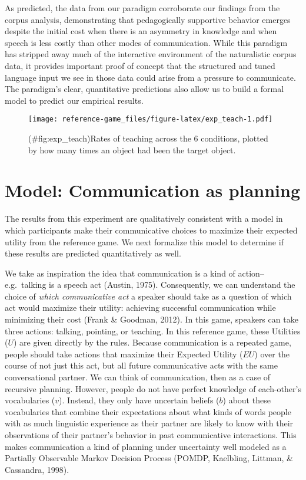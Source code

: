 \documentclass[english,,man,floatsintext]{apa6}
\begin{document}
As predicted, the data from our paradigm corroborate our findings from the corpus analysis, demonstrating that pedagogically supportive behavior emerges despite the initial cost when there is an asymmetry in knowledge and when speech is less costly than other modes of communication. While this paradigm has stripped away much of the interactive environment of the naturalistic corpus data, it provides important proof of concept that the structured and tuned language input we see in those data could arise from a pressure to communicate. The paradigm's clear, quantitative predictions also allow us to build a formal model to predict our empirical results.

\begin{figure}
\centering
\texttt{[image: reference-game\_files/figure-latex/exp\_teach-1.pdf]}
\caption{(\#fig:exp\_teach)Rates of teaching across the 6 conditions, plotted by how many times an object had been the target object.}
\end{figure}

\hypertarget{model-communication-as-planning}{%
\section{Model: Communication as planning}\label{model-communication-as-planning}}

The results from this experiment are qualitatively consistent with a model in which participants make their communicative choices to maximize their expected utility from the reference game. We next formalize this model to determine if these results are predicted quantitatively as well.

\newcommand{\E}[1]{\mathbb{E}\left[ #1 \right]}

We take as inspiration the idea that communication is a kind of action--e.g.~talking is a speech act (Austin, 1975). Consequently, we can understand the choice of \emph{which communicative act} a speaker should take as a question of which act would maximize their utility: achieving successful communication while minimizing their cost (Frank \& Goodman, 2012). In this game, speakers can take three actions: talking, pointing, or teaching. In this reference game, these Utilities (\(U\)) are given directly by the rules. Because communication is a repeated game, people should take actions that maximize their Expected Utility (\(EU\)) over the course of not just this act, but all future communicative acts with the same conversational partner. We can think of communication, then as a case of recursive planning. However, people do not have perfect knowledge of each-other's vocabularies (\(v\)). Instead, they only have uncertain beliefs (\(b\)) about these vocabularies that combine their expectations about what kinds of words people with as much linguistic experience as their partner are likely to know with their observations of their partner's behavior in past communicative interactions. This makes communication a kind of planning under uncertainty well modeled as a Partially Observable Markov Decision Process (POMDP, Kaelbling, Littman, \& Cassandra, 1998).
\end{document}
